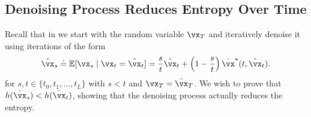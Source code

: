 \documentclass[../../book-main.tex]{subfiles}
\begin{document}
\subsection{Denoising Process Reduces Entropy Over Time}\label{sub:denoising_entropy_decreases}

Recall that in  we start with the random variable \(\vx_{T}\) and iteratively denoise it using iterations of the form
\begin{equation}\label{eq:app_denoising_iteration}
    \hat{\vx}_{s} \doteq \Ex[\vx_{s} \mid \vx_{t} = \hat{\vx}_{t}] = \frac{s}{t}\hat{\vx}_{t} + \bp{1 - \frac{s}{t}}\bar{\vx}^{\ast}(t, \hat{\vx}_{t}).
\end{equation}
for \(s, t \in \{t_{0}, t_{1}, \dots, t_{L}\}\) with \(s < t\) and \(\vx_{T} = \hat{\vx}_{T}\). We wish to prove that \(h(\hat{\vx}_{s}) < h(\hat{\vx}_{t})\), showing that the denoising process actually reduces the entropy.
\end{document}
